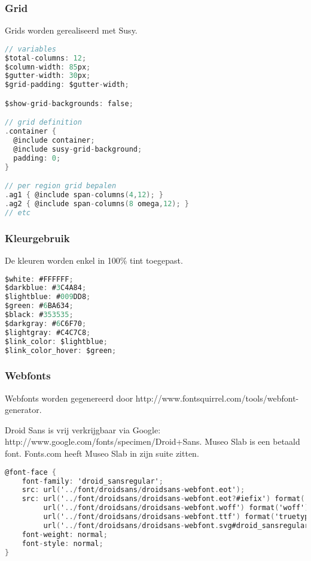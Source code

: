\subsubsection{Grid}
Grids worden gerealiseerd met Susy.
\begin{lstlisting}[language=C] 
// variables
$total-columns: 12;
$column-width: 85px;
$gutter-width: 30px;
$grid-padding: $gutter-width;

$show-grid-backgrounds: false;

// grid definition
.container {
  @include container;
  @include susy-grid-background;
  padding: 0;
}

// per region grid bepalen
.ag1 { @include span-columns(4,12); } 
.ag2 { @include span-columns(8 omega,12); } 
// etc
 \end{lstlisting} 
 
 \subsubsection{Kleurgebruik}
De kleuren worden enkel in 100\% tint toegepast.

\begin{lstlisting}[language=C] 
$white: #FFFFFF;
$darkblue: #3C4A84;
$lightblue: #009DD8;
$green: #6BA634;
$black: #353535;
$darkgray: #6C6F70;
$lightgray: #C4C7C8;
$link_color: $lightblue;
$link_color_hover: $green;
\end{lstlisting} 

\subsubsection{Webfonts}
Webfonts worden gegenereerd door http://www.fontsquirrel.com/tools/webfont-generator.

Droid Sans is vrij verkrijgbaar via Google: http://www.google.com/fonts/specimen/Droid+Sans.
Museo Slab is een betaald font. Fonts.com heeft Museo Slab in zijn suite zitten.
\begin{lstlisting}[language=C] 
@font-face {
    font-family: 'droid_sansregular';
    src: url('../font/droidsans/droidsans-webfont.eot');
    src: url('../font/droidsans/droidsans-webfont.eot?#iefix') format('embedded-opentype'),
         url('../font/droidsans/droidsans-webfont.woff') format('woff'),
         url('../font/droidsans/droidsans-webfont.ttf') format('truetype'),
         url('../font/droidsans/droidsans-webfont.svg#droid_sansregular') format('svg');
    font-weight: normal;
    font-style: normal;
}
\end{lstlisting} 
 
